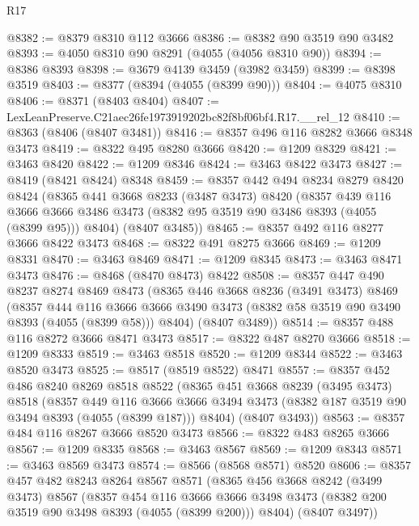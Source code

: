 \begin{lexlean}{R17}
\begin{coremodule}
@8382 := @8379 @8310 @112 @3666
@8386 := @8382 @90 @3519 @90 @3482
@8393 := @4050 @8310 @90 @8291 (@4055 (@4056 @8310 @90))
@8394 := @8386 @8393
@8398 := @3679 @4139 @3459 (@3982 @3459)
@8399 := @8398 @3519
@8403 := @8377 (@8394 (@4055 (@8399 @90)))
@8404 := @4075 @8310
@8406 := @8371 (@8403 @8404)
@8407 := LexLeanPreserve.C21aec26fe1973919202bc82f8bf06bf4.R17.__rel_12
@8410 := @8363 (@8406 (@8407 @3481))
@8416 := @8357 @496 @116 @8282 @3666 @8348 @3473
@8419 := @8322 @495 @8280 @3666
@8420 := @1209 @8329
@8421 := @3463 @8420
@8422 := @1209 @8346
@8424 := @3463 @8422 @3473
@8427 := @8419 (@8421 @8424) @8348
@8459 := @8357
    @442
    @494
    @8234
    @8279
    @8420
    @8424
    (@8365
      @441
      @3668
      @8233
      (@3487 @3473)
      @8420
      (@8357
        @439
        @116
        @3666
        @3666
        @3486
        @3473
        (@8382 @95 @3519 @90 @3486 @8393 (@4055 (@8399 @95)))
        @8404)
      (@8407 @3485))
@8465 := @8357 @492 @116 @8277 @3666 @8422 @3473
@8468 := @8322 @491 @8275 @3666
@8469 := @1209 @8331
@8470 := @3463 @8469
@8471 := @1209 @8345
@8473 := @3463 @8471 @3473
@8476 := @8468 (@8470 @8473) @8422
@8508 := @8357
    @447
    @490
    @8237
    @8274
    @8469
    @8473
    (@8365
      @446
      @3668
      @8236
      (@3491 @3473)
      @8469
      (@8357
        @444
        @116
        @3666
        @3666
        @3490
        @3473
        (@8382 @58 @3519 @90 @3490 @8393 (@4055 (@8399 @58)))
        @8404)
      (@8407 @3489))
@8514 := @8357 @488 @116 @8272 @3666 @8471 @3473
@8517 := @8322 @487 @8270 @3666
@8518 := @1209 @8333
@8519 := @3463 @8518
@8520 := @1209 @8344
@8522 := @3463 @8520 @3473
@8525 := @8517 (@8519 @8522) @8471
@8557 := @8357
    @452
    @486
    @8240
    @8269
    @8518
    @8522
    (@8365
      @451
      @3668
      @8239
      (@3495 @3473)
      @8518
      (@8357
        @449
        @116
        @3666
        @3666
        @3494
        @3473
        (@8382 @187 @3519 @90 @3494 @8393 (@4055 (@8399 @187)))
        @8404)
      (@8407 @3493))
@8563 := @8357 @484 @116 @8267 @3666 @8520 @3473
@8566 := @8322 @483 @8265 @3666
@8567 := @1209 @8335
@8568 := @3463 @8567
@8569 := @1209 @8343
@8571 := @3463 @8569 @3473
@8574 := @8566 (@8568 @8571) @8520
@8606 := @8357
    @457
    @482
    @8243
    @8264
    @8567
    @8571
    (@8365
      @456
      @3668
      @8242
      (@3499 @3473)
      @8567
      (@8357
        @454
        @116
        @3666
        @3666
        @3498
        @3473
        (@8382 @200 @3519 @90 @3498 @8393 (@4055 (@8399 @200)))
        @8404)
      (@8407 @3497))

\end{coremodule}
\end{lexlean}
